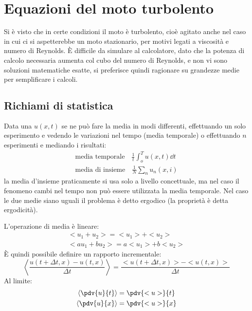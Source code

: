 %
\section{Equazioni del moto turbolento}  
Si è visto che in certe condizioni il moto è turbolento, cioè agitato anche nel caso in cui ci si aspetterebbe un moto stazionario, per motivi legati a viscosità e numero di Reynolds.
È difficile da simulare al calcolatore, dato che la potenza di calcolo necessaria aumenta col cubo del numero di Reynolds, e non vi sono soluzioni matematiche esatte, si preferisce quindi ragionare su grandezze medie per semplificare i calcoli.

\subsection{Richiami di statistica}
Data una $u(x,t)$ se ne può fare la media in modi differenti, effettuando un solo esperimento e vedendo le variazioni nel tempo (media temporale) o effettuando $n$ esperimenti e mediando i risultati:
%
	\begin{equation*}
		\begin{gathered}
			\text{media temporale} \quad \frac{1}{t}\int_o^T u(x,t) \dd{t}\\
			\text{media di insieme} \quad \frac{1}{N} \sum_n u_n(x,i)
		\end{gathered}
	\end{equation*}
%
la media d'insieme praticamente si usa solo a livello concettuale, ma nel caso il fenomeno cambi nel tempo non può essere utilizzata la media temporale.
Nel caso le due medie siano uguali il problema è detto ergodico (la proprietà è detta ergodicità).

L'operazione di media è lineare:
%
	\begin{equation*}
		\begin{gathered}
			<u_1 + u_2> = <u_1> + <u_2>\\
			<a u_1 + b u_2> = a <u_1> + b <u_2>
		\end{gathered}
	\end{equation*}
%
È quindi possibile definire un rapporto incrementale:
%
	\begin{equation*}
		\left< \frac{u(t + \Delta t, x) - u(t,x)}{\Delta t} \right> = \frac{<u(t + \Delta t, x)> - <u(t,x)>}{\Delta t}
	\end{equation*}
%
Al limite:
%
	\begin{equation*}
		\begin{gathered}
			\left< \pdv{u}{t} \right> = \pdv{<u>}{t}\\
			\left< \pdv{u}{x} \right> = \pdv{<u>}{x}
		\end{gathered}
	\end{equation*}
%

